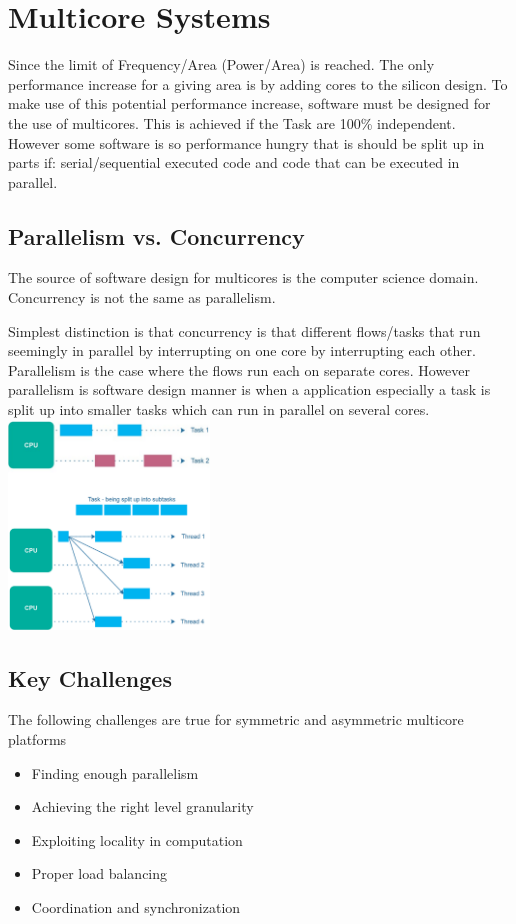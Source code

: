 \section{Multicore Systems}
Since the limit of Frequency/Area (Power/Area) is reached.
The only performance increase for a giving area is by adding cores to the silicon design.
To make use of this potential performance increase, software must be designed for the use of multicores.
This is achieved if the Task are 100\% independent.
However some software is so performance hungry that is should be split up in parts if:
serial/sequential executed code and code that can be executed in parallel.

\subsection{Parallelism vs. Concurrency}
\begin{paracol}{2}
    The source of software design for multicores is the computer science domain.
    Concurrency is not the same as parallelism.

    Simplest distinction is that concurrency is that different flows/tasks that run seemingly in parallel by interrupting on one core by interrupting each other.
    Parallelism is the case where the flows run each on separate cores.
    However parallelism is software design manner is when a application especially a task is split up into smaller tasks which can run in parallel on several cores.
    \switchcolumn
    \vspace{-1.5cm}
    \includegraphics[width=0.4\textwidth]{images/Multicore/parallel_vs_concurrent.png}
\end{paracol}

\subsection{Key Challenges}
The following challenges are true for symmetric and asymmetric multicore platforms
\begin{itemize}
    \item Finding enough parallelism
    \item Achieving the right level granularity
    \item Exploiting locality in computation
    \item Proper load balancing
    \item Coordination and synchronization
\end{itemize}

